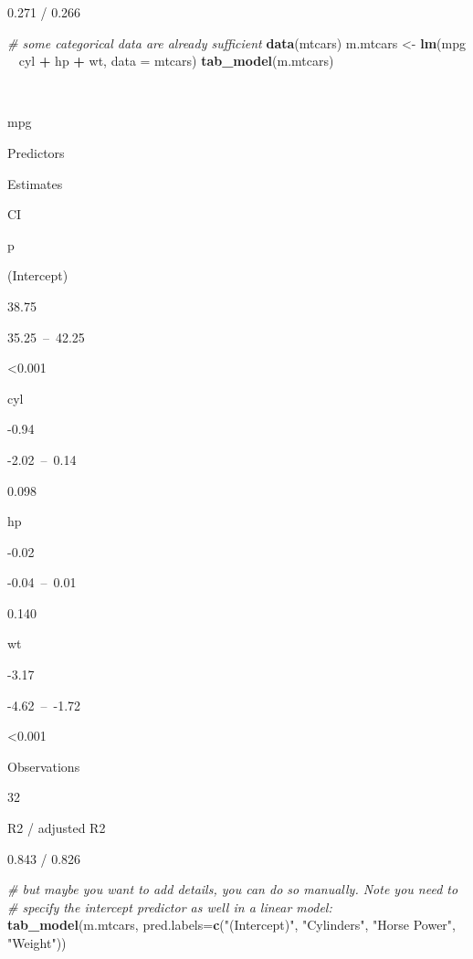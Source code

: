 \documentclass[]{article}
\newenvironment{Shaded}{\begin{snugshade}}{\end{snugshade}}
\newcommand{\KeywordTok}[1]{\textcolor[rgb]{0.13,0.29,0.53}{\textbf{#1}}}
\newcommand{\DataTypeTok}[1]{\textcolor[rgb]{0.13,0.29,0.53}{#1}}
\newcommand{\StringTok}[1]{\textcolor[rgb]{0.31,0.60,0.02}{#1}}
\newcommand{\CommentTok}[1]{\textcolor[rgb]{0.56,0.35,0.01}{\textit{#1}}}
\newcommand{\OperatorTok}[1]{\textcolor[rgb]{0.81,0.36,0.00}{\textbf{#1}}}
\newcommand{\NormalTok}[1]{#1}
\begin{document}
0.271 / 0.266

\begin{Shaded}
\begin{Highlighting}[]
\CommentTok{# some categorical data are already sufficient}
\KeywordTok{data}\NormalTok{(mtcars)}
\NormalTok{m.mtcars <-}\StringTok{ }\KeywordTok{lm}\NormalTok{(mpg }\OperatorTok{~}\StringTok{ }\NormalTok{cyl }\OperatorTok{+}\StringTok{ }\NormalTok{hp }\OperatorTok{+}\StringTok{ }\NormalTok{wt, }\DataTypeTok{data =}\NormalTok{ mtcars)}
\KeywordTok{tab_model}\NormalTok{(m.mtcars)}
\end{Highlighting}
\end{Shaded}

~

mpg

Predictors

Estimates

CI

p

(Intercept)

38.75

35.25~--~42.25

\textless{}0.001

cyl

-0.94

-2.02~--~0.14

0.098

hp

-0.02

-0.04~--~0.01

0.140

wt

-3.17

-4.62~--~-1.72

\textless{}0.001

Observations

32

R2 / adjusted R2

0.843 / 0.826

\begin{Shaded}
\begin{Highlighting}[]
\CommentTok{# but maybe you want to add details, you can do so manually. Note you need to }
\CommentTok{# specify the intercept predictor as well in a linear model:}
\KeywordTok{tab_model}\NormalTok{(m.mtcars,  }
          \DataTypeTok{pred.labels=}\KeywordTok{c}\NormalTok{(}\StringTok{"(Intercept)"}\NormalTok{, }\StringTok{"Cylinders"}\NormalTok{, }\StringTok{"Horse Power"}\NormalTok{, }\StringTok{"Weight"}\NormalTok{))}
\end{Highlighting}
\end{Shaded}
\end{document}

